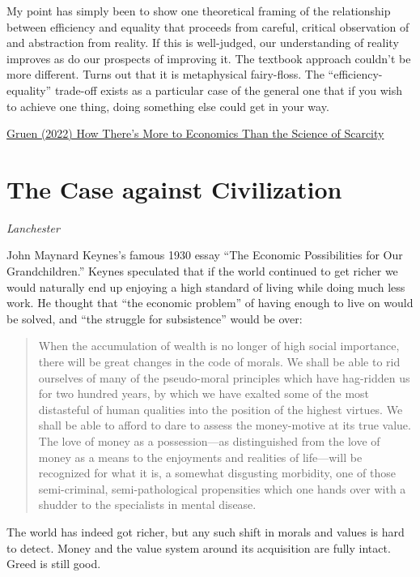 \documentclass[
]{book}
\begin{document}
My point has simply been to show one theoretical framing of the relationship between efficiency and equality that proceeds from careful, critical observation of and abstraction from reality. If this is well-judged, our understanding of reality improves as do our prospects of improving it. The textbook approach couldn't be more different. Turns out that it is metaphysical fairy-floss. The ``efficiency-equality'' trade-off exists as a particular case of the general one that if you wish to achieve one thing, doing something else could get in your way.

\href{https://evonomics.com/how-theres-more-to-economics-than-the-science-of-scarcity/}{Gruen (2022) How There's More to Economics Than the Science of Scarcity}

\hypertarget{the-case-against-civilization}{%
\section{The Case against Civilization}\label{the-case-against-civilization}}

\emph{Lanchester}

John Maynard Keynes's famous 1930 essay ``The Economic Possibilities for Our Grandchildren.'' Keynes speculated that if the world continued to get richer we would naturally end up enjoying a high standard of living while doing much less work. He thought that ``the economic problem'' of having enough to live on would be solved, and ``the struggle for subsistence'' would be over:

\begin{quote}
When the accumulation of wealth is no longer of high social importance, there will be great changes in the code of morals. We shall be able to rid ourselves of many of the pseudo-moral principles which have hag-ridden us for two hundred years, by which we have exalted some of the most distasteful of human qualities into the position of the highest virtues. We shall be able to afford to dare to assess the money-motive at its true value. The love of money as a possession---as distinguished from the love of money as a means to the enjoyments and realities of life---will be recognized for what it is, a somewhat disgusting morbidity, one of those semi-criminal, semi-pathological propensities which one hands over with a shudder to the specialists in mental disease.
\end{quote}

The world has indeed got richer, but any such shift in morals and values is hard to detect. Money and the value system around its acquisition are fully intact. Greed is still good.
\end{document}
